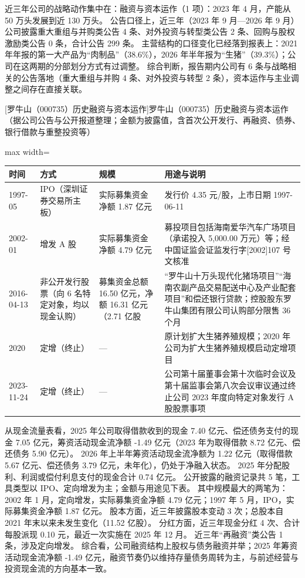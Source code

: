  近三年公司的战略动作集中在：融资与资本运作（1 项）：2023 年 4 月，产能从 50 万头发展到近 130 万头。 公告口径上，近三年（2023 年 9 月---2026 年 9 月）公司披露重大重组与并购类公告 4 条、对外投资与转型类公告 2 条、回购与股权激励类公告 0 条，合计公告 299 条。 主营结构的口径变化已经落到报表上：2021 年年报的第一大产品为“肉制品”（38.6\%），2026 年半年报为“生猪”（39.3\%）；公司在这两期的分部划分方式有过调整。 综合判断，报告期内公司有 6 条与战略相关的公告落地（重大重组与并购 4 条、对外投资与转型 2 条），资本运作与主业调整之间存在直接关联。

\begin{center}\small\setlength{\tabcolsep}{4pt}
[罗牛山（000735）历史融资与资本运作]{罗牛山（000735）历史融资与资本运作（据公司公告与公开报道整理；金额为披露值，含首次公开发行、再融资、债券、银行借款与重整投资等）}
\begin{adjustbox}{max width=\textwidth}
\begin{tabular}{@{}p{1.45cm}p{2.55cm}p{4.05cm}p{4.95cm}@{}}
\toprule
时间 & 方式 & 规模 & 用途与说明 \\
\midrule
1997-05 & IPO（深圳证券交易所主板） & 实际募集资金净额 1.87 亿元 & 发行价 4.35 元/\allowbreak{}股，\allowbreak{}上市日期 1997-06-11 \\
2002-01 & 增发 A 股 & 实际募集资金净额 4.79 亿元 & 募投项目包括海南爱华汽车广场项目（承诺投入 5,\allowbreak{}000.00 万元）等；经中国证监会证监发行字[2002]107 号文核准 \\
2016-04-13 & 非公开发行股票（向 6 名特定对象，均以现金认购） & 募集资金总额 16.50 亿元，\allowbreak{}净额 16.31 亿元（2.71 亿股 & “罗牛山十万头现代化猪场项目”“海南农副产品交易配送中心及产业配套项目”和偿还银行贷款；控股股东罗牛山集团有限公司认购部分限售 36 个月 \\
2020 & 定增（终止） & --- & 原计划扩大生猪养殖规模；2020 年公司为扩大生猪养殖规模启动定增项目 \\
2023-11-24 & 定增（终止） & --- & 公司第十届董事会第十次临时会议及第十届监事会第八次会议审议通过终止公司 2023 年度向特定对象发行 A 股股票事项 \\
\bottomrule
\end{tabular}
\end{adjustbox}
\end{center}

 从现金流量表看，2025 年公司取得借款收到的现金 7.40 亿元、偿还债务支付的现金 7.05 亿元，筹资活动现金流净额 -1.49 亿元（2023 年为取得借款 8.72 亿元、偿还债务 5.90 亿元）。 2026 年上半年筹资活动现金流净额为 1.22 亿元（取得借款 5.67 亿元、偿还债务 3.79 亿元，未年化），仍处于净融入状态。 2025 年分配股利、利润或偿付利息支付的现金合计 0.74 亿元。 公开披露的融资记录共 5 笔，工具类型以 IPO、定向增发为主；金额与用途见下表。 其中规模最大的两笔为：2002 年 1 月，定向增发，实际募集资金净额 4.79 亿元；1997 年 5 月，IPO，实际募集资金净额 1.87 亿元。 股本方面，近三年披露股本变动 3 次；总股本自 2021 年末以来未发生变化（11.52 亿股）。 分红方面，近三年现金分红 4 次、合计每股派现 0.10 元，最近一次实施在 2025 年 12 月。 近三年“再融资”类公告 1 条，涉及定向增发。 综合看，公司融资结构上股权与债务融资并举；2025 年筹资活动现金流净额 -1.49 亿元，融资节奏仍以维持存量债务周转为主，与前述经营与投资现金流的方向基本一致。

